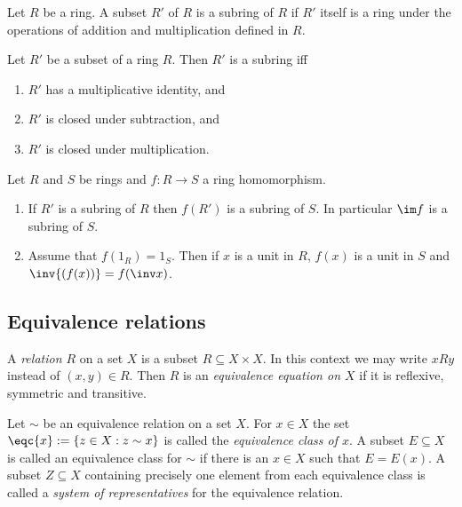 \documentclass{article}
\begin{document}
\begin{definition}
    Let $R$ be a ring. A subset $R'$ of $R$ is a subring of $R$ if $R'$ itself 
    is a ring under the operations of addition and multiplication defined in $R$.
\end{definition}

\begin{proposition}[Notes 3.4.26]
    Let $R'$ be a subset of a ring $R$. Then $R'$ is a subring iff 
    \begin{enumerate}
        \item $R'$ has a multiplicative identity, and 
        \item $R'$ is closed under subtraction, and 
        \item $R'$ is closed under multiplication.
    \end{enumerate} 
\end{proposition}

\begin{proposition}[Notes 3.4.28]
    Let $R$ and $S$ be rings and $f:R\to S$ a ring homomorphism.
    \begin{enumerate}
        \item If $R'$ is a subring of $R$ then $f(R')$ is a subring of $S$. In particular
            $\im f$ is a subring of $S$.
        \item Assume that $f(1_R)=1_S$. Then if $x$ is a unit in $R$, $f(x)$ is a unit 
            in $S$ and $\inv{(f(x))} = f(\inv x)$.
    \end{enumerate} 
\end{proposition}

\subsection{Equivalence relations}

\begin{definition}
    A \emph{relation $R$} on a set $X$ is a subset $R\subseteq X\times X$. In this context we 
    may write $xRy$ instead of $(x,y)\in R$. Then $R$ is an \emph{equivalence equation on $X$}
    if it is reflexive, symmetric and transitive.
\end{definition}
\begin{definition}
    Let $\sim$ be an equivalence relation on a set $X$. For $x\in X$ the set $\eqc{x}:=\{z\in X:z\sim x\}$
    is called the \emph{equivalence class of $x$}. A subset $E\subseteq X$ is called an equivalence 
    class for $\sim$ if there is an $x\in X$ such that $E=E(x)$. A subset $Z\subseteq X$ containing 
    precisely one element from each equivalence class is called a \emph{system of representatives}
    for the equivalence relation.
\end{definition}
\end{document}
